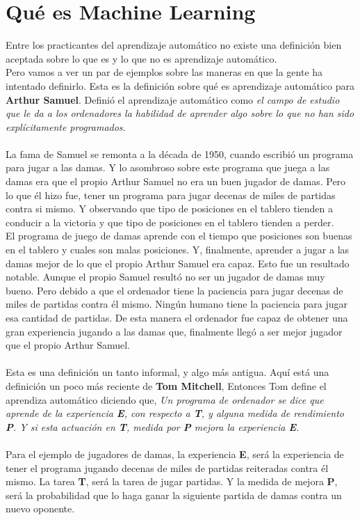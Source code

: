 \documentclass{report}
\begin{document}
\section{Qué es Machine Learning}
Entre los practicantes del aprendizaje
automático no existe una definición bien aceptada sobre lo que es y lo que no es aprendizaje automático.\\
Pero vamos a ver un par de ejemplos sobre las maneras en
que la gente ha intentado definirlo. Esta es la definición sobre qué es aprendizaje automático para
\textbf{Arthur Samuel}. Definió el aprendizaje automático como \textit{el campo de estudio que le da a los ordenadores la habilidad de aprender algo sobre lo que no han sido explícitamente programados.}\\\\ La fama de Samuel se remonta a la década
de 1950, cuando escribió un programa para jugar a las damas.
Y lo asombroso sobre este programa que juega a las damas era que el propio Arthur Samuel
no era un buen jugador de damas. Pero lo que él hizo fue, tener un programa para jugar
decenas de miles de partidas contra si mismo. Y observando que tipo de posiciones en el tablero
tienden a conducir a la victoria y que tipo de posiciones en el tablero tienden a
perder.\\ El programa de juego de damas aprende con el tiempo que posiciones son buenas
en el tablero y cuales son malas posiciones. Y, finalmente, aprender a jugar
a las damas mejor de lo que el propio Arthur Samuel era capaz. Esto fue un resultado notable.
Aunque el propio Samuel resultó no ser un jugador de damas muy bueno. Pero debido a que el
ordenador tiene la paciencia para jugar decenas de miles de partidas contra él mismo. Ningún
humano tiene la paciencia para jugar esa cantidad de partidas. De esta manera el ordenador fue capaz de
obtener una gran experiencia jugando a las damas que, finalmente llegó a ser
mejor jugador que el propio Arthur Samuel.\\\\ Esta es una definición
un tanto informal, y algo más antigua. Aquí está una definición un poco más reciente de\textbf{ Tom
Mitchell}, Entonces Tom define el aprendiza automático
diciendo que, \textit{Un programa de ordenador se dice que aprende de la experiencia\textbf{ E}, con respecto a \textbf{T}, y alguna
medida de rendimiento\textbf{ P}. Y si esta actuación en\textbf{ T}, medida por \textbf{P} mejora
la experiencia\textbf{ E}.}\\\\
Para el ejemplo de jugadores de damas, la experiencia \textbf{E}, será la
experiencia de tener el programa jugando decenas de miles de partidas reiteradas contra él mismo.
La tarea \textbf{T}, será la tarea de jugar partidas. Y la medida de mejora \textbf{P},
será la probabilidad que lo haga ganar la siguiente partida de damas contra
un nuevo oponente.
\end{document}
